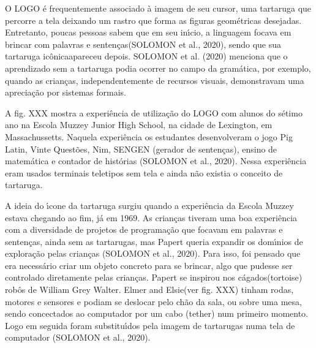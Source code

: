 \documentclass[
12pt,		%
openright,	%
twoside,  %
a4paper,			%
chapter=TITLE,		%
english,			%
french,				%
spanish,			%
brazil				%
]{USPSC-classe/USPSC}
\begin{document}
O LOGO \'e frequentemente associado \`a imagem de seu cursor, uma tartaruga que percorre a tela deixando um rastro que forma as figuras geom\'etricas desejadas. Entretanto, poucas pessoas sabem que em seu in\'{\i}cio, a linguagem \textquotedbl focava em brincar com palavras e senten\c{c}as\textquotedbl  (SOLOMON et al., 2020), sendo que sua tartaruga \textquotedbl ic\^onica\textquotedbl  apareceu depois.  SOLOMON et al. (2020) menciona que o aprendizado sem a tartaruga podia ocorrer no campo da gram\'atica, por exemplo, quando as crian\c{c}as, independentemente de recursos visuais, demonstravam uma aprecia\c{c}\~ao por sistemas formais.









A fig. XXX mostra a experi\^encia de utiliza\c{c}\~ao do LOGO com alunos do s\'etimo ano na Escola Muzzey Junior High School, na cidade de Lexington, em Massachussetts. Naquela experi\^encia os estudantes desenvolveram o jogo Pig Latin, Vinte Quest\~oes, Nim, SENGEN (gerador de senten\c{c}as), ensino de matem\'atica e contador de hist\'orias  (SOLOMON et al., 2020). Nessa experi\^encia eram usados terminais teletipos sem tela e ainda n\~ao existia o conceito de tartaruga.









A ideia do \'{\i}cone da tartaruga surgiu quando a experi\^encia da Escola Muzzey estava chegando ao fim, j\'a em 1969. As crian\c{c}as tiveram uma boa experi\^encia com a diversidade de projetos de programa\c{c}\~ao que focavam em palavras e senten\c{c}as, ainda sem as tartarugas, mas Papert queria expandir os dom\'{\i}nios de explora\c{c}\~ao pelas crian\c{c}as  (SOLOMON et al., 2020). Para isso, foi pensado que era necess\'ario criar um objeto concreto para se brincar, algo que pudesse ser controlado diretamente pelas crian\c{c}as. Papert se inspirou nos \textquotedbl c\'agados\textquotedbl   (tortoise) rob\^os de William Grey Walter. \textquotedbl Elmer and Elsie\textquotedbl  (ver fig. XXX) tinham rodas, motores e sensores e podiam se deslocar pelo ch\~ao da sala, ou sobre uma mesa, sendo concectados ao computador por um cabo (tether) num primeiro momento. Logo em seguida foram substitu\'{\i}dos pela imagem de tartarugas numa tela de computador (SOLOMON et al., 2020).
\end{document}
